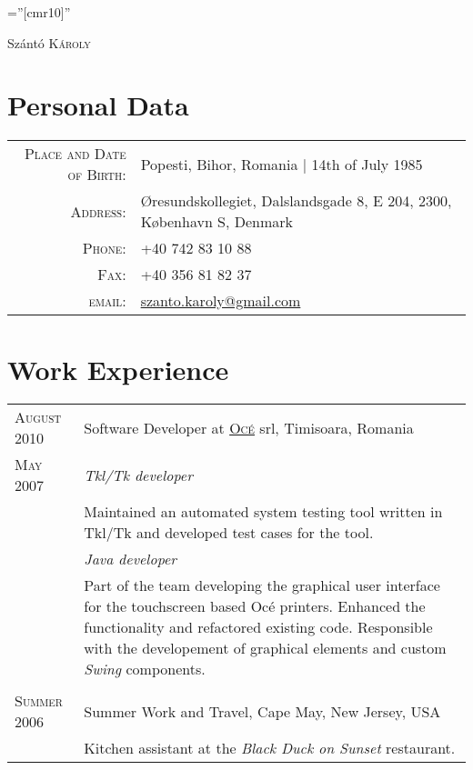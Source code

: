 \documentclass[a4paper,10pt]{article}
\begin{document}
\pagestyle{plain} %

\font\fb=''[cmr10]'' %

 
\par{\centering
		{\Huge Sz\'ant\'o \textsc{K\'aroly}
	}\bigskip\par}
	
\section{Personal Data}

\begin{tabular}{rl}
    \textsc{Place and Date of Birth:} & Popesti, Bihor, Romania  | 14th of July
    1985 \\ \textsc{Address:}   & Øresundskollegiet, Dalslandsgade 8, E 204,
    2300, København S, Denmark \\ 
    \textsc{Phone:}     & +40 742 83 10 88\\
    \textsc{Fax:}		& +40 356 81 82 37\\
    \textsc{email:}     &
    \href{mailto:szanto.karoly@gmail.com}{szanto.karoly@gmail.com}
\end{tabular}

\section{Work Experience}
\begin{tabular}{p{2.5cm}|p{11cm}}
 \raggedleft \textsc{August 2010} & Software Developer at
 \textsc{\href{http://www3.oce.com/ro/}{Oc\'e}} srl, Timisoara, Romania
 \\\raggedleft \textsc{May 2007}&\emph{Tkl/Tk
 developer}\\&\footnotesize{Maintained an automated system testing tool written in Tkl/Tk and developed test cases for the tool.}\\&\emph{Java
 developer}\\&\footnotesize{Part of the team developing the graphical user
 interface for the touchscreen based Oc\'e printers. Enhanced the functionality
 and refactored existing code. Responsible with the developement of graphical
 elements and custom \emph{Swing} components.}
\\\multicolumn{2}{c}{} \\
\raggedleft \textsc{Summer 2006} & Summer Work and Travel, Cape May, New Jersey,
USA\\&\footnotesize{Kitchen assistant at the \emph{Black Duck on Sunset}
restaurant.}
\end{tabular}
\end{document}
